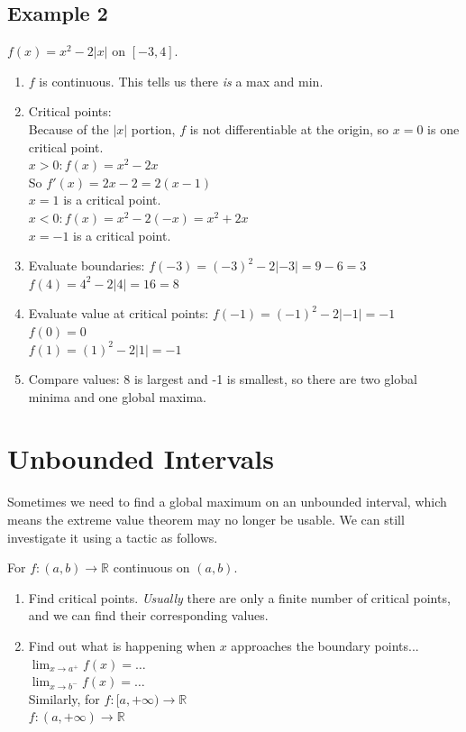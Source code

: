 \subsection{Example 2}
$f(x) = x^2 - 2|x|$ on $[-3,4]$.
\begin{enumerate}
  \item $f$ is continuous. This tells us there \emph{is} a max and min.
  \item Critical points: \\
  Because of the $|x|$ portion, $f$ is not differentiable at the origin, so
  $x=0$ is one critical point. \\
  $x>0 : f(x) = x^2 - 2x$ \\
  So $f'(x) = 2x-2 = 2(x-1)$ \\
  $x=1$ is a critical point. \\
  $x < 0: f(x) = x^2 -2(-x) = x^2 + 2x$ \\
  $x=-1$ is a critical point. \\
  \item Evaluate boundaries:
  $f(-3) = (-3)^2 -2|-3| = 9-6 = 3$ \\
  $f(4) = 4^2 - 2|4| = 16 = 8$ \\
  \item Evaluate value at critical points:
  $f(-1) = (-1)^2 -2|-1| = -1$ \\
  $f(0) = 0$ \\
  $f(1) = (1)^2 -2|1| = -1$ \\
  \item Compare values: 8 is largest and -1 is smallest, so there are two global
  minima and one global maxima.
\end{enumerate}

\section{Unbounded Intervals}
Sometimes we need to find a global maximum on an unbounded interval, which means
the extreme value theorem may no longer be usable. We can still investigate it
using a tactic as follows.

For $f: (a,b) \to \mathbb{R}$ continuous on $(a,b)$.
\begin{enumerate}
  \item Find critical points. \emph{Usually} there are only a finite number of
  critical points, and we can find their corresponding values.
  \item Find out what is happening when $x$ approaches the boundary points... \\
  $\lim_{x \to a^+} f(x) = \ldots$ \\
  $\lim_{x \to b^-} f(x) = \ldots$ \\
  Similarly, for
  $f:[a,+\infty) \to \mathbb{R}$\\
  $f:(a,+\infty) \to \mathbb{R}$\\
\end{enumerate}

